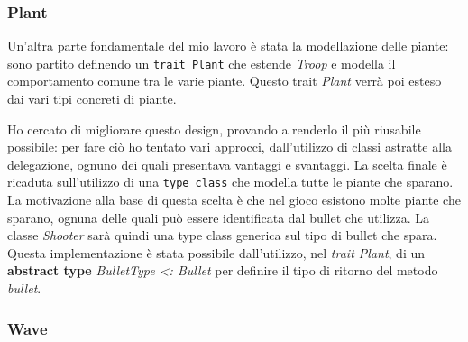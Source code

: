 \subsubsection{Plant}
Un'altra parte fondamentale del mio lavoro è stata la modellazione delle piante: sono partito definendo un \texttt{trait Plant} che estende \textit{Troop} e modella il comportamento comune tra le varie piante. Questo trait \textit{Plant} verrà poi esteso dai vari tipi concreti di piante.

Ho cercato di migliorare questo design, provando a renderlo il più riusabile possibile: per fare ciò ho tentato vari approcci, dall'utilizzo di classi astratte alla delegazione, ognuno dei quali presentava vantaggi e svantaggi. La scelta finale è ricaduta sull'utilizzo di una \texttt{type class} che modella tutte le piante che sparano. La motivazione alla base di questa scelta è che nel gioco esistono molte piante che sparano, ognuna delle quali può essere identificata dal bullet che utilizza.
La classe \textit{Shooter} sarà quindi una type class generica sul tipo di bullet che spara. Questa implementazione è stata possibile dall'utilizzo, nel \textit{trait Plant}, di un \textbf{abstract type} \textit{BulletType <: Bullet} per definire il tipo di ritorno del metodo \textit{bullet}.





\subsubsection{Wave}